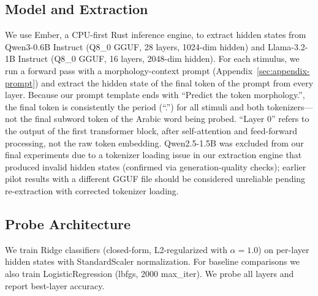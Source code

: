 \documentclass[11pt,a4paper]{article}
\begin{document}
\subsection{Model and Extraction}
We use Ember, a CPU-first Rust inference engine, to extract hidden states from Qwen3-0.6B Instruct (Q8\_0 GGUF, 28 layers, 1024-dim hidden) and Llama-3.2-1B Instruct (Q8\_0 GGUF, 16 layers, 2048-dim hidden). For each stimulus, we run a forward pass with a morphology-context prompt (Appendix~\ref{sec:appendix-prompt}) and extract the hidden state of the final token of the prompt from every layer. Because our prompt template ends with ``Predict the token morphology.'', the final token is consistently the period (``.'') for all stimuli and both tokenizers---not the final subword token of the Arabic word being probed. ``Layer 0'' refers to the output of the first transformer block, after self-attention and feed-forward processing, not the raw token embedding. Qwen2.5-1.5B was excluded from our final experiments due to a tokenizer loading issue in our extraction engine that produced invalid hidden states (confirmed via generation-quality checks); earlier pilot results with a different GGUF file should be considered unreliable pending re-extraction with corrected tokenizer loading.

\subsection{Probe Architecture}\label{sec:probe-architecture}
We train Ridge classifiers (closed-form, L2-regularized with $\alpha=1.0$) on per-layer hidden states with StandardScaler normalization. For baseline comparisons we also train LogisticRegression (lbfgs, 2000 max\_iter). We probe all layers and report best-layer accuracy.
\end{document}
